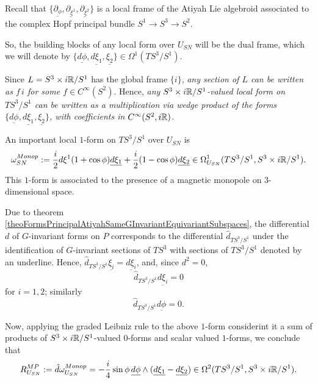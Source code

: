 \linea



\begin{example}[Hopf $S^3$]
Recall that $\{\underline{\partial_\phi}, \underline{\partial_{\xi^1}}, \underline{\partial_{\xi^2}}\}$ is a local frame of the Atiyah Lie algebroid associated to the complex Hopf principal bundle $S^1 \to S^3 \to S^2$. 

So, the building blocks of any local form over $U_{SN}$ will be the dual frame, which we will denote by $\{\underline{d\phi}, \underline{d\xi_1}, \underline{\xi_2}\} \in \Omega^1(TS^3/S^1)$. 

Since $L = S^3 \times i\mathbb{R} / S^1$ has the global frame $\{i\}$, \textit{any section of $L$ can be written as $f\,i$ for some $f \in C^\infty(S^2)$}. Hence, \textit{any $S^3 \times i\mathbb{R}/S^1$-valued local form on $TS^3/S^1$ can be written as a multiplication via wedge product of the forms $\{\underline{d\phi}, \underline{d\xi_1}, \underline{\xi_2}\}$, with coefficients in $C^\infty(S^2, i\mathbb{R})$}.

An important local $1$-form on $TS^3/S^1$ over $U_{SN}$ is
\begin{equation}
    \lbtext{\omega^{Monop}_{{SN}}} := \frac{i}{2} d\xi^1 (1 + \cos \phi) \underline{d \xi_1} + \frac{i}{2} (1- \cos\phi)\underline{d\xi_2} \in \Omega_{U_{SN}}^1(TS^3/S^1, S^3 \times i\RR/S^1).
\end{equation} This $1$-form is associated to the presence of a magnetic monopole on $3$-dimensional space.

Due to theorem \ref{theoFormsPrincipalAtiyahSameGInvariantEquivariantSubspaces}, the differential $d$ of $G$-invariant forms on $P$ corresponds to the differential $\hat d_{TS^3/S^1}$ under the identification of $G$-invariant sections of $TS^3$ with sections of $TS^3/S^1$ denoted by an underline. Hence, $\hat d_{TS^3/S^1} \underline{\xi_i} = \underline{d \xi_i}$, and, since $d^2 = 0$, 
\begin{equation*}
    \hat d_{TS^3/S^1} {\underline{d\xi_i}} = 0
\end{equation*} for $i = 1, 2$; similarly 
\begin{equation*}
     \hat d_{TS^3/S^1} \underline{d \phi} = 0.
\end{equation*}

Now, applying the graded Leibniz rule to the above $1$-form considerint it a sum of products of $S^3\times i\mathbb{R}/S^1$-valued $0$-forms and scalar valued $1$-forms, we conclude that
\begin{equation}
    \lbtext{R^{MP}_{U_{SN}}} 
    := \hat d \omega^{Monop}_{U_{SN}} = -\frac{i}{4} \sin \phi \, \underline{d\phi} \wedge (\underline{d\xi_1} - \underline{d\xi_2}) 
    \in \Omega^2(TS^3/S^1, S^3 \times i\RR / S^1).
\end{equation}
\end{example}


